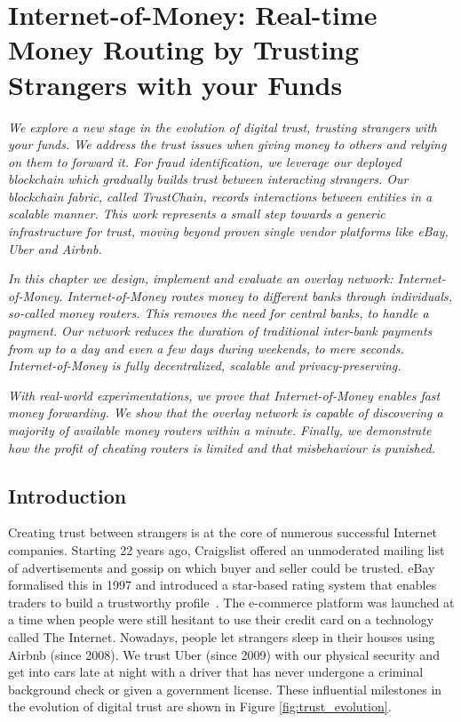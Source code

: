 \chapter{Internet-of-Money: Real-time Money Routing by Trusting Strangers with your Funds}
\label{chapter:iom}

\emph{We explore a new stage in the evolution of digital trust, trusting strangers with your funds.
We address the trust issues when giving money to others and relying on them to forward it.
For fraud identification, we leverage our deployed blockchain which gradually builds trust between interacting strangers.
Our blockchain fabric, called \emph{TrustChain}, records interactions between entities in a scalable manner.
This work represents a small step towards a generic infrastructure for trust, moving beyond proven single vendor platforms like eBay, Uber and Airbnb.}

\emph{In this chapter we design, implement and evaluate an overlay network: \emph{Internet-of-Money}.
Internet-of-Money routes money to different banks through individuals, so-called \emph{money routers}.
This removes the need for central banks, to handle a payment.
Our network reduces the duration of traditional inter-bank payments from up to a day and even a few days during weekends, to mere seconds.
Internet-of-Money is fully decentralized, scalable and privacy-preserving.}

\emph{With real-world experimentations, we prove that Internet-of-Money enables fast money forwarding.
We show that the overlay network is capable of discovering a majority of available money routers within a minute.
Finally, we demonstrate how the profit of cheating routers is limited and that misbehaviour is punished.}

\newpage

\section{Introduction}
Creating trust between strangers is at the core of numerous successful Internet companies.
Starting 22 years ago, Craigslist offered an unmoderated mailing list of advertisements and gossip on which buyer and seller could be trusted.
eBay formalised this in 1997 and introduced a star-based rating system that enables traders to build a trustworthy profile~\cite{resnick2002trust}.
The e-commerce platform was launched at a time when people were still hesitant to use their credit card on a technology called The Internet.
Nowadays, people let strangers sleep in their houses using Airbnb (since 2008).
We trust Uber (since 2009) with our physical security and get into cars late at night with a driver that has never undergone a criminal background check or given a government license.
These influential milestones in the evolution of digital trust are shown in Figure \ref{fig:trust_evolution}.

